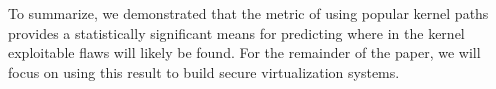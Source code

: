 To summarize, we demonstrated that the metric of using popular
kernel paths provides a statistically significant
means for predicting where in the kernel exploitable flaws
will likely be found. For the remainder of the paper, we will
focus on using this result to build secure virtualization systems.
